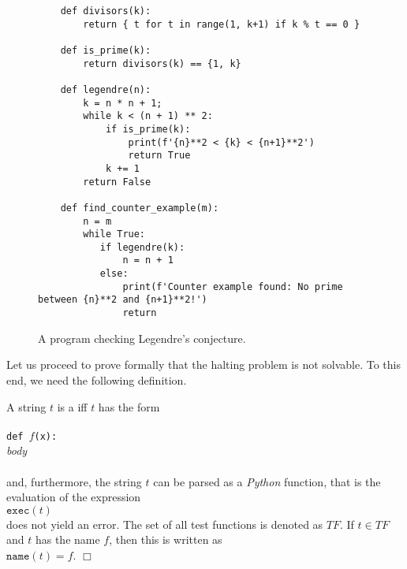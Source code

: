 \begin{figure}[!ht]
\centering
\begin{verbatim}
    def divisors(k):
        return { t for t in range(1, k+1) if k % t == 0 }

    def is_prime(k):
        return divisors(k) == {1, k}    
    
    def legendre(n):
        k = n * n + 1;
        while k < (n + 1) ** 2:
            if is_prime(k):
                print(f'{n}**2 < {k} < {n+1}**2')
                return True
            k += 1
        return False

    def find_counter_example(m):
        n = m
        while True:
           if legendre(k):
               n = n + 1
           else:
               print(f'Counter example found: No prime between {n}**2 and {n+1}**2!')
               return
\end{verbatim}
\vspace*{-0.3cm}
\caption{A program checking Legendre's conjecture.}
\label{fig:legendre.stlx}
\end{figure}

Let us proceed to prove formally that the halting problem is not solvable.  To this end, we need the
following definition.

\begin{Definition} 
A string $t$ is a  
iff $t$ has the form \\[0.2cm]
\hspace*{1.3cm} \texttt{}         \\
\hspace*{1.3cm} \texttt{def $f$(x):} \\
\hspace*{1.8cm} \textsl{body}        \\
\hspace*{1.3cm} \texttt{}         \\[0.2cm]
and, furthermore, the string $t$ can be parsed as a \textsl{Python} function, that is the evaluation of
the expression
\\[0.2cm]
\hspace*{1.3cm}
$\texttt{exec}(t)$
\\[0.2cm]
does not yield an error.  
The set of all test functions is denoted as $T\!F$.  If $t \in T\!F$ and $t$ has the name $f$, then
this is written as 
\\[0.2cm]
\hspace*{1.3cm}
$\mathtt{name}(t) = f$. \hspace*{\fill} $\Box$
\end{Definition}

